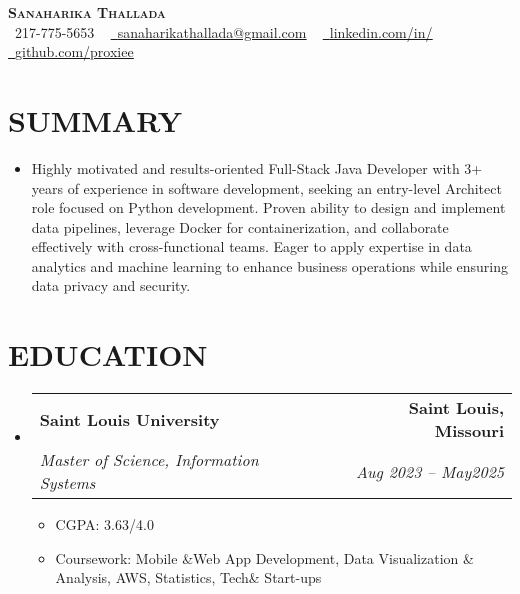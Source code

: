 \documentclass[letterpaper,11pt]{article}
\makeatletter
\newcommand{\resumeItem}[1]{\item\small{{#1 \vspace{-3pt}}}}
\newcommand{\resumeSubheading}[4]{\vspace{-2pt}\item\begin{tabular*}{0.97\textwidth}[t]{l@{\extracolsep{\fill}}r}\textbf{#1} & #2 \\ \textit{\small#3} & \textit{\small #4} \\ \end{tabular*}\vspace{-7pt}}
\newcommand{\resumeSubHeadingListStart}{\begin{itemize}[leftmargin=0.15in, label={}]}
\newcommand{\resumeSubHeadingListEnd}{\end{itemize}}
\newcommand{\resumeItemListStart}{\begin{itemize}}
\newcommand{\resumeItemListEnd}{\end{itemize}\vspace{-5pt}}
\makeatother
\begin{document}
\begin{center}
    \textbf{\Huge \scshape {\fontsize{15pt}{20pt}\selectfont Sanaharika Thallada}} \\ \vspace{1pt}
    \small \raisebox{-0.1\height}\faPhone\ 217-775-5653 ~ \href{mailto:sanaharikathallada@gmail.com}{\raisebox{-0.2\height}\faEnvelope\  \underline{sanaharikathallada@gmail.com}} ~ 
    \href{https://www.linkedin.com/in/yashwanthtirupati/}{\raisebox{-0.2\height}\faLinkedin\ \underline{linkedin.com/in/}} ~ 
    \href{https://github.com/proxiee}{\raisebox{-0.2\height}\faGithub\ \underline{github.com/proxiee}}
    \vspace{-8pt}
\end{center}

\section{{\fontsize{9pt}{20pt}\selectfont \textbf{SUMMARY}}}\resumeSubHeadingListStart
\resumeItem{Highly motivated and results-oriented Full-Stack Java Developer with 3+ years of experience in software development, seeking an entry-level Architect role focused on Python development. Proven ability to design and implement data pipelines, leverage Docker for containerization, and collaborate effectively with cross-functional teams.  Eager to apply expertise in data analytics and machine learning to enhance business operations while ensuring data privacy and security.}
\resumeSubHeadingListEnd\vspace{-18pt}
\section{{\fontsize{9pt}{20pt}\selectfont \textbf{EDUCATION}}}\resumeSubHeadingListStart
\resumeSubheading{Saint Louis University}{\textbf{Saint Louis, Missouri}}{Master of Science, Information Systems}{Aug 2023 – May2025}
\resumeItemListStart
\resumeItem{CGPA: 3.63/4.0}
\resumeItem{Coursework: Mobile \&Web App Development, Data Visualization \& Analysis, AWS, Statistics, Tech\& Start-ups}
\resumeItemListEnd
\resumeSubHeadingListEnd\vspace{-18pt}
\end{document}
